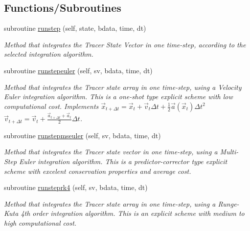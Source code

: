 \subsection*{Functions/\+Subroutines}
\begin{DoxyCompactItemize}
\item 
subroutine \mbox{\hyperlink{namespacesolver__mod_a75c5c8b01ae4ae193ff03dbe7e5fc6af}{runstep}} (self, state, bdata, time, dt)
\begin{DoxyCompactList}\small\item\em Method that integrates the Tracer State Vector in one time-\/step, according to the selected integration algorithm. \end{DoxyCompactList}\item 
subroutine \mbox{\hyperlink{namespacesolver__mod_a21533e195501ebb46c1814aeaede4c55}{runstepeuler}} (self, sv, bdata, time, dt)
\begin{DoxyCompactList}\small\item\em Method that integrates the Tracer state array in one time-\/step, using a Velocity Euler integration algorithm. This is a one-\/shot type explicit scheme with low computational cost. Implements $ {\vec {x}}_{t+\Delta t}={\vec {x}}_{t}+{\vec {v}}_{t}\Delta t+{\frac {1}{2}}{\vec {a}}({\vec {x}}_{t})\Delta t^{2}$ $ {\vec {v}}_{t+\Delta t}={\vec {v}}_{t}+\frac{{\vec {a}}_{t+\Delta t}+{\vec {a}}_{t}}{2}\Delta t$. \end{DoxyCompactList}\item 
subroutine \mbox{\hyperlink{namespacesolver__mod_ae574f8d772b89d5c3c602db278c05325}{runstepmseuler}} (self, sv, bdata, time, dt)
\begin{DoxyCompactList}\small\item\em Method that integrates the Tracer state vector in one time-\/step, using a Multi-\/\+Step Euler integration algorithm. This is a predictor-\/corrector type explicit scheme with excelent conservation properties and average cost. \end{DoxyCompactList}\item 
subroutine \mbox{\hyperlink{namespacesolver__mod_a11436fc89bf6c713930a83b5cc52a0cd}{runsteprk4}} (self, sv, bdata, time, dt)
\begin{DoxyCompactList}\small\item\em Method that integrates the Tracer state array in one time-\/step, using a Runge-\/\+Kuta 4th order integration algorithm. This is an explicit scheme with medium to high computational cost. \end{DoxyCompactList}\item 

\end{DoxyCompactItemize}

